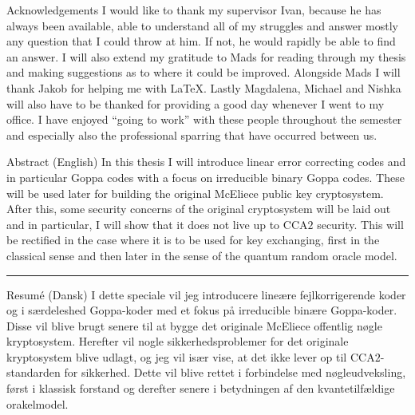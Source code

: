 \clearpage
\thispagestyle{chapter}


\begin{multiabstract}{Acknowledgements}
\noindent I would like to thank my supervisor Ivan, because he has always been available, able to understand all of my struggles and answer mostly any question that I could throw at him. If not, he would rapidly be able to find an answer. I will also extend my gratitude to Mads for reading through my thesis and making suggestions as to where it could be improved. Alongside Mads I will thank Jakob for helping me with \LaTeX{}. Lastly Magdalena, Michael and Nishka will also have to be thanked for providing a good day whenever I went to my office. I have enjoyed ``going to work'' with these people throughout the semester and especially also the professional sparring that have occurred between us.
\end{multiabstract}



\clearpage

\thispagestyle{chapter}

\begin{multiabstract}{Abstract (English)} 
\noindent In this thesis I will introduce linear error correcting codes and in particular Goppa codes with a focus on irreducible binary Goppa codes. These will be used later for building the original McEliece public key cryptosystem. After this, some security concerns of the original cryptosystem will be laid out and in particular, I will show that it does not live up to $\mathrm{CCA}2$ security. This will be rectified in the case where it is to be used for key exchanging, first in the classical sense and then later in the sense of the quantum random oracle model.
\end{multiabstract}


\plainbreak{2}

\begin{multiabstract}{Resumé (Dansk)}
\noindent I dette speciale vil jeg introducere lineære fejlkorrigerende koder og i særdeleshed Goppa-koder med et fokus på irreducible binære Goppa-koder. Disse vil blive brugt senere til at bygge det originale McEliece offentlig nøgle kryptosystem. Herefter vil nogle sikkerhedsproblemer for det originale kryptosystem blive udlagt, og jeg vil især vise, at det ikke lever op til $\mathrm{CCA}2$-standarden for sikkerhed. Dette vil blive rettet i forbindelse med nøgleudveksling, først i klassisk forstand og derefter senere i betydningen af den kvantetilfældige orakelmodel.
\end{multiabstract}




